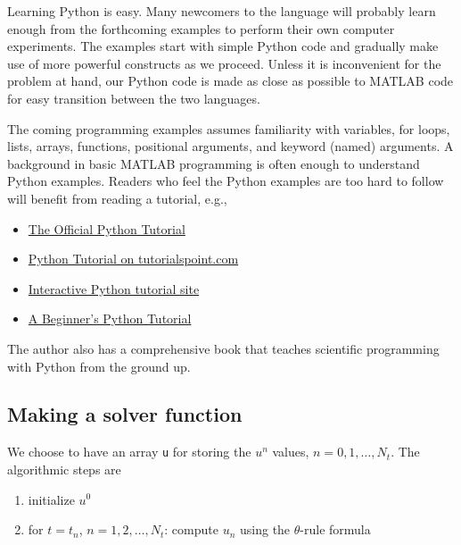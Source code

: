 \documentclass[%
oneside,                 %
final,                   %
10pt]{article}
\begin{document}
\noindent
Learning Python is easy. Many newcomers to the language will probably
learn enough from the forthcoming examples to perform their own computer
experiments. The examples start with simple Python code and gradually
make use of more powerful constructs as we proceed. Unless it is
inconvenient for the problem at hand, our Python code is made as
close as possible to MATLAB code for easy transition between the two
languages.

The coming programming examples assumes familiarity with
variables, for loops, lists, arrays,
functions, positional arguments, and keyword (named) arguments.
A background in basic MATLAB programming is often enough to understand
Python examples.
Readers who feel the Python examples are too hard to follow will
benefit from reading a tutorial, e.g.,

\begin{itemize}
  \item \href{{http://docs.python.org/2/tutorial/}}{The Official Python Tutorial}

  \item \href{{http://www.tutorialspoint.com/python/}}{Python Tutorial on tutorialspoint.com}

  \item \href{{http://www.learnpython.org/}}{Interactive Python tutorial site}

  \item \href{{http://en.wikibooks.org/wiki/A_Beginner's_Python_Tutorial}}{A Beginner's Python Tutorial}
\end{itemize}

\noindent
The author also has a comprehensive book \cite{Langtangen_2012} that teaches
scientific programming with Python from the ground up.



\subsection{Making a solver function}
\label{decay:py1}

We choose to have an array \texttt{u} for storing the $u^n$ values, $n=0,1,\ldots,N_t$.
The algorithmic steps are

\begin{enumerate}
 \item initialize $u^0$

 \item for $t=t_n$, $n=1,2,\ldots,N_t$: compute $u_n$ using
    the $\theta$-rule formula
\end{enumerate}
\end{document}
